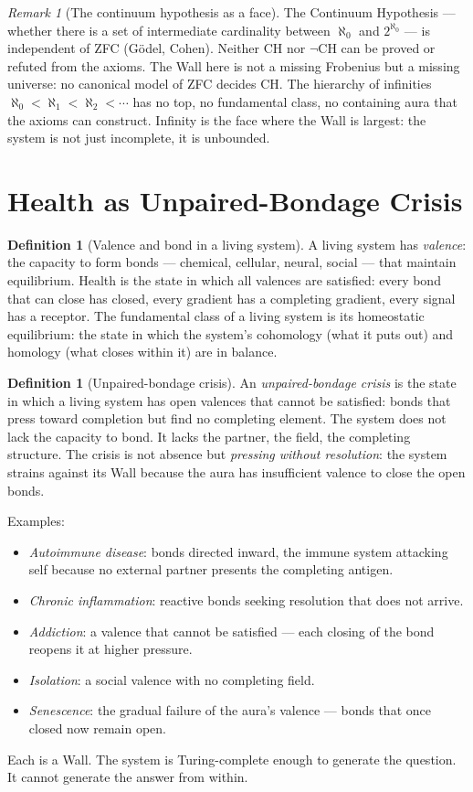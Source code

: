 \documentclass[12pt]{article}
\theoremstyle{definition}
\newtheorem{definition}[theorem]{Definition}
\theoremstyle{remark}
\newtheorem{remark}[theorem]{Remark}
\begin{document}
\begin{remark}[The continuum hypothesis as a face]
The Continuum Hypothesis --- whether there is a set
of intermediate cardinality between $\aleph_0$ and $2^{\aleph_0}$ ---
is independent of ZFC (G\"odel, Cohen).
Neither CH nor $\neg$CH can be proved or refuted from the axioms.
The Wall here is not a missing Frobenius but a missing universe:
no canonical model of ZFC decides CH.
The hierarchy of infinities $\aleph_0 < \aleph_1 < \aleph_2 < \cdots$
has no top, no fundamental class, no containing aura
that the axioms can construct.
Infinity is the face where the Wall is largest:
the system is not just incomplete, it is unbounded.
\end{remark}

\section{Health as Unpaired-Bondage Crisis}

\begin{definition}[Valence and bond in a living system]
A living system has \emph{valence}: the capacity to form bonds ---
chemical, cellular, neural, social --- that maintain equilibrium.
Health is the state in which all valences are satisfied:
every bond that can close has closed,
every gradient has a completing gradient,
every signal has a receptor.
The fundamental class of a living system is its homeostatic equilibrium:
the state in which the system's cohomology (what it puts out)
and homology (what closes within it) are in balance.
\end{definition}

\begin{definition}[Unpaired-bondage crisis]
An \emph{unpaired-bondage crisis} is the state in which
a living system has open valences that cannot be satisfied:
bonds that press toward completion but find no completing element.
The system does not lack the capacity to bond.
It lacks the partner, the field, the completing structure.
The crisis is not absence but \emph{pressing without resolution}:
the system strains against its Wall because the aura
has insufficient valence to close the open bonds.

Examples:
\begin{itemize}
\item \emph{Autoimmune disease}: bonds directed inward,
  the immune system attacking self because no external partner
  presents the completing antigen.
\item \emph{Chronic inflammation}: reactive bonds
  seeking resolution that does not arrive.
\item \emph{Addiction}: a valence that cannot be satisfied ---
  each closing of the bond reopens it at higher pressure.
\item \emph{Isolation}: a social valence with no completing field.
\item \emph{Senescence}: the gradual failure of the aura's valence ---
  bonds that once closed now remain open.
\end{itemize}
Each is a Wall. The system is Turing-complete enough
to generate the question. It cannot generate the answer from within.
\end{definition}
\end{document}
